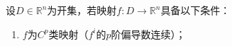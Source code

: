 
\begin{issues}
\issueDraft
\end{issues}
设$D\in \mathbb R^n$为开集，若映射$f:D\rightarrow \mathbb R^n$具备以下条件：
\begin{enumerate}
\item $f$为$C^p$类映射（$f^i$的$p$阶偏导数连续）；
\end{enumerate}


